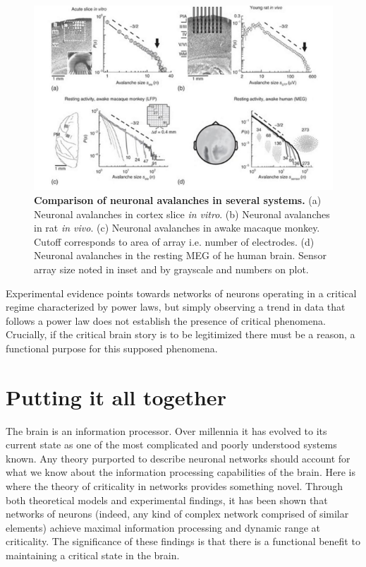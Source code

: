 \documentclass[12pt]{article}
\begin{document}
\begin{figure}      
  \begin{center}    
 \includegraphics[width=.70\textwidth]{avalanchesplenzbook}    
    \caption{\textbf{Comparison of neuronal avalanches in several systems.} (a) Neuronal avalanches in cortex slice \textit{in vitro}. (b) Neuronal avalanches in rat \textit{in vivo}. (c) Neuronal avalanches in awake macaque monkey. Cutoff corresponds to area of array i.e. number of electrodes. (d) Neuronal avalanches in the resting MEG of he human brain. Sensor array size noted in inset and by grayscale and numbers on plot. \cite{Plenz2014}}
   \label{Figure::Neuronal avalanches in vitro and in vivo}   
  \end{center}     
   \end{figure}

Experimental evidence points towards networks of neurons operating in a critical regime characterized by power laws, but simply observing a trend in data that follows a power law does not establish the presence of critical phenomena. Crucially, if the critical brain story is to be legitimized there must be a reason, a functional purpose for this supposed phenomena.   
      
\section*{Putting it all together}

The brain is an information processor. Over millennia it has evolved to its current state as one of the most complicated and poorly understood systems known. Any theory purported to describe neuronal networks should account for what we know about the information processing capabilities of the brain. Here is where the theory of criticality in networks provides something novel. Through both theoretical models and experimental findings, it has been shown that networks of neurons (indeed, any kind of complex network comprised of similar elements) achieve maximal information processing and dynamic range at criticality. The significance of these findings is that there is a functional benefit to maintaining a critical state in the brain.
\end{document}
